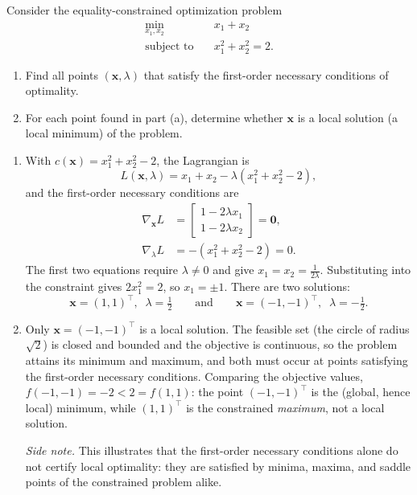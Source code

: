 \begin{exercise} %
    
    Consider the equality-constrained optimization problem
    \[
    \begin{aligned}
        \min_{x_1, x_2} \quad & x_1 + x_2 \\
        \text{subject to} \quad & x_1^2 + x_2^2 = 2.
    \end{aligned}
    \]
    \begin{enumerate}[label=(\alph*)]
        \item Find all points $(\mathbf{x}, \lambda)$ that satisfy the first-order necessary conditions of optimality.
        \item For each point found in part (a), determine whether $\mathbf{x}$ is a local solution (a local minimum) of the problem.
    \end{enumerate}
    
\end{exercise}

\begin{solution}
    
    \begin{enumerate}[label=(\alph*)]
        \item With $c(\mathbf{x}) = x_1^2 + x_2^2 - 2$, the Lagrangian is
        \[
            L(\mathbf{x}, \lambda) = x_1 + x_2 - \lambda (x_1^2 + x_2^2 - 2),
        \]
        and the first-order necessary conditions are
        \begin{align*}
            \nabla_{\mathbf{x}} L &= \begin{bmatrix} 1 - 2\lambda x_1 \\ 1 - 2\lambda x_2 \end{bmatrix} = \mathbf{0}, \\
            \nabla_{\lambda} L &= -(x_1^2 + x_2^2 - 2) = 0.
        \end{align*}
        The first two equations require $\lambda \neq 0$ and give $x_1 = x_2 = \frac{1}{2\lambda}$. Substituting into the constraint gives $2 x_1^2 = 2$, so $x_1 = \pm 1$. There are two solutions:
        \[
            \mathbf{x} = (1, 1)^\top, \;\; \lambda = \tfrac{1}{2}
            \qquad \text{and} \qquad
            \mathbf{x} = (-1, -1)^\top, \;\; \lambda = -\tfrac{1}{2}.
        \]
        \item Only $\mathbf{x} = (-1,-1)^\top$ is a local solution. The feasible set (the circle of radius $\sqrt{2}$) is closed and bounded and the objective is continuous, so the problem attains its minimum and maximum, and both must occur at points satisfying the first-order necessary conditions. Comparing the objective values, $f(-1,-1) = -2 < 2 = f(1,1)$: the point $(-1,-1)^\top$ is the (global, hence local) minimum, while $(1,1)^\top$ is the constrained \emph{maximum}, not a local solution.

        \emph{Side note.} This illustrates that the first-order necessary conditions alone do not certify local optimality: they are satisfied by minima, maxima, and saddle points of the constrained problem alike.
    \end{enumerate}
    
\end{solution}

